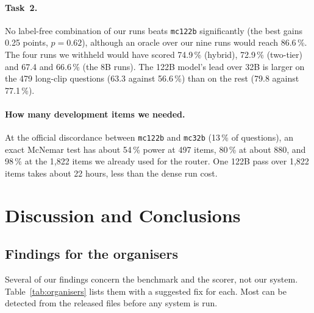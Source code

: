 \documentclass[sigconf,nonacm]{acmart}
\begin{document}
\paragraph{Task~2.}
No label-free combination of our runs beats \texttt{mc122b} significantly (the
best gains 0.25 points, $p=0.62$), although an oracle over our nine runs would
reach 86.6\,\%. The four runs we withheld would have scored 74.9\,\% (hybrid),
72.9\,\% (two-tier) and 67.4 and 66.6\,\% (the 8B runs). The 122B model's lead
over 32B is larger on the 479 long-clip questions (63.3 against 56.6\,\%) than on
the rest (79.8 against 77.1\,\%).

\paragraph{How many development items we needed.}
At the official discordance between \texttt{mc122b} and \texttt{mc32b} (13\,\% of
questions), an exact McNemar test has about 54\,\% power at 497 items, 80\,\% at
about 880, and 98\,\% at the 1,822 items we already used for the router. One 122B
pass over 1,822 items takes about 22 hours, less than the dense run cost.

\section{Discussion and Conclusions}

\subsection{Findings for the organisers}

Several of our findings concern the benchmark and the scorer, not our system.
Table~\ref{tab:organisers} lists them with a suggested fix for each. Most can be
detected from the released files before any system is run.
\end{document}
